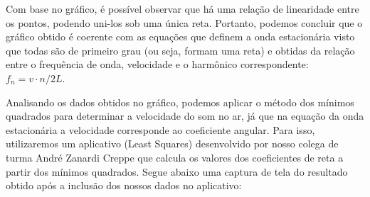 Com base no gráfico, é possível observar que há uma relação de linearidade entre os pontos, podendo uni-los sob uma única reta. Portanto, podemos concluir que o gráfico obtido é coerente com as equações que definem a onda estacionária visto que todas são de primeiro grau (ou seja, formam uma reta) e obtidas da relação entre o frequência de onda, velocidade e o harmônico correspondente: $f_n=v \cdot n/2L$.

Analisando os dados obtidos no gráfico, podemos aplicar o método dos mínimos quadrados para determinar a velocidade do som no ar, já que na equação da onda estacionária a velocidade corresponde ao coeficiente angular. Para isso, utilizaremos um aplicativo (Least Squares) desenvolvido por nosso colega de turma André Zanardi Creppe que calcula os valores dos coeficientes de reta a partir dos mínimos quadrados. Segue abaixo uma captura de tela do resultado obtido após a inclusão dos nossos dados no aplicativo:

